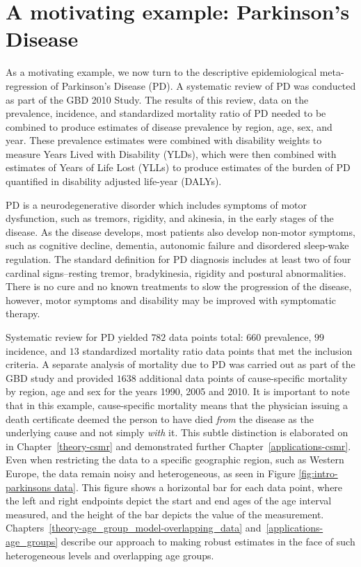 \section{A motivating example: Parkinson's Disease}
\label{intro-complete_ex}

As a motivating example, we now turn to the descriptive
epidemiological meta-regression of Parkinson's Disease (PD). A
systematic review of PD was conducted as part of the GBD 2010
Study.\cite{GBD_2010_or_parkinsons_paper} The results of this review,
data on the prevalence, incidence, and standardized mortality ratio of PD
needed to be combined to produce estimates of disease prevalence by
region, age, sex, and year.  These prevalence estimates were combined
with disability weights to measure Years Lived with Disability (YLDs),
which were then combined with estimates of Years of Life Lost (YLLs)
to produce estimates of the burden of PD quantified in disability
adjusted life-year (DALYs).

PD is a neurodegenerative disorder which includes symptoms of motor
dysfunction, such as tremors, rigidity, and akinesia, in the early
stages of the disease.  As the disease develops, most patients also
develop non-motor symptoms, such as cognitive decline, dementia,
autonomic failure and disordered sleep-wake regulation.  The standard
definition for PD diagnosis includes at least two of four cardinal
signs--resting tremor, bradykinesia, rigidity and postural abnormalities.
There is no cure and no known treatments to slow the progression of the disease,
however, motor symptoms and disability may be improved with
symptomatic therapy.\cite{poewe_natural_2006, pollock_prevalence_1966, larsen_clinical_1994}

Systematic review for PD yielded $782$ data points total: $660$
prevalence, $99$ incidence, and $13$ standardized mortality ratio data
points that met the inclusion criteria.  A separate analysis of
mortality due to PD was carried out as part of the GBD study and
provided $1638$ additional data points of cause-specific mortality by
region, age and sex for the years 1990, 2005 and 2010.  It is
important to note that in this example, cause-specific mortality means
that the physician issuing a death certificate deemed the person to
have died \emph{from} the disease as the underlying cause and not
simply \emph{with} it.  This subtle distinction is elaborated on in
Chapter~\ref{theory-csmr} and demonstrated further
Chapter~\ref{applications-csmr}.  Even when restricting the data to a
specific geographic region, such as Western Europe, the data remain
noisy and heterogeneous, as seen in Figure \ref{fig:intro-parkinsons
  data}. This figure shows a horizontal bar for each data point, where
the left and right endpoints depict the start and end ages of the age
interval measured, and the height of the bar depicts the value of the
measurement. Chapters~\ref{theory-age_group_model-overlapping_data}
and~\ref{applications-age_groups} describe our approach to making
robust estimates in the face of such heterogeneous levels and
overlapping age groups.

